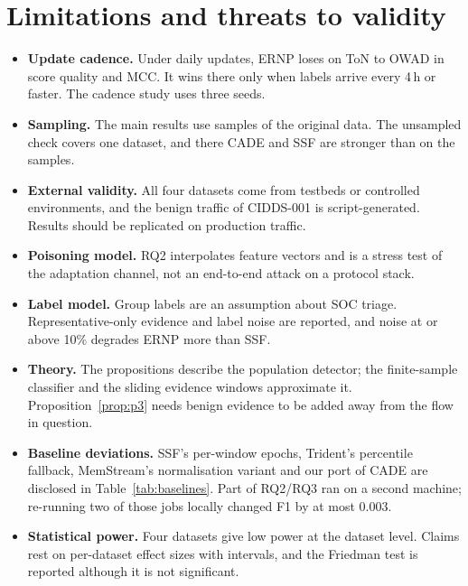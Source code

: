 \documentclass[a4paper,fleqn]{cas-dc}
\newcommand{\ERNP}{ERNP\xspace}
\begin{document}
\section{Limitations and threats to validity}
\label{sec:limitations}
\begin{itemize}
  \item \textbf{Update cadence.} Under daily updates, \ERNP loses on ToN to OWAD in score quality and MCC. It wins there only when labels arrive every 4\,h or faster. The cadence study uses three seeds.
  \item \textbf{Sampling.} The main results use samples of the original data. The unsampled check covers one dataset, and there CADE and SSF are stronger than on the samples.
  \item \textbf{External validity.} All four datasets come from testbeds or controlled environments, and the benign traffic of CIDDS-001 is script-generated. Results should be replicated on production traffic.
  \item \textbf{Poisoning model.} RQ2 interpolates feature vectors and is a stress test of the adaptation channel, not an end-to-end attack on a protocol stack.
  \item \textbf{Label model.} Group labels are an assumption about SOC triage. Representative-only evidence and label noise are reported, and noise at or above 10\% degrades \ERNP more than SSF.
  \item \textbf{Theory.} The propositions describe the population detector; the finite-sample classifier and the sliding evidence windows approximate it. Proposition~\ref{prop:p3} needs benign evidence to be added away from the flow in question.
  \item \textbf{Baseline deviations.} SSF's per-window epochs, Trident's percentile fallback, MemStream's normalisation variant and our port of CADE are disclosed in Table~\ref{tab:baselines}. Part of RQ2/RQ3 ran on a second machine; re-running two of those jobs locally changed F1 by at most 0.003.
  \item \textbf{Statistical power.} Four datasets give low power at the dataset level. Claims rest on per-dataset effect sizes with intervals, and the Friedman test is reported although it is not significant.
\end{itemize}

\end{document}
